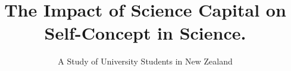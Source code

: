 %
%
%
%
%
%
\RequirePackage{fix-cm}
%

\documentclass[smallextended]{svjour3}       %
%
\smartqed  %
%
\usepackage{graphicx}
\usepackage{rotating}
\usepackage{url}
\usepackage{apacite}
\usepackage{xcolor}
\usepackage{setspace}
%
%
%
%
%
\usepackage{afterpage}
\usepackage{csquotes}
\usepackage{lscape}


\title{The Impact of Science Capital on Self-Concept in Science.}


\subtitle{A Study of University Students in New Zealand}


